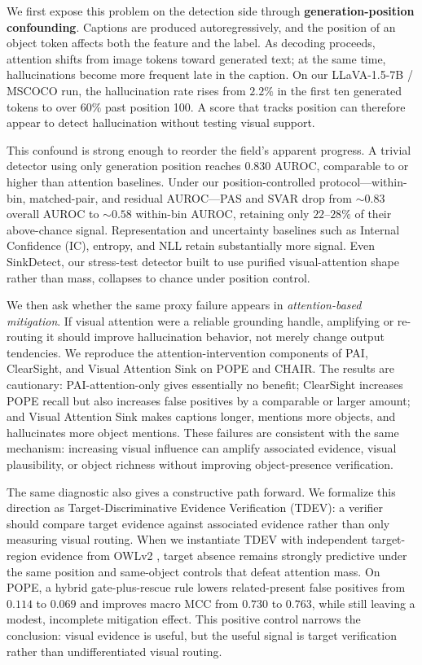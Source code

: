 We first expose this problem on the detection side through \textbf{generation-position confounding}. Captions are produced autoregressively, and the position of an object token affects both the feature and the label. As decoding proceeds, attention shifts from image tokens toward generated text; at the same time, hallucinations become more frequent late in the caption. On our LLaVA-1.5-7B / MSCOCO run, the hallucination rate rises from $2.2\%$ in the first ten generated tokens to over $60\%$ past position 100. A score that tracks position can therefore appear to detect hallucination without testing visual support.

This confound is strong enough to reorder the field's apparent progress. A trivial detector using only generation position reaches $0.830$ AUROC, comparable to or higher than attention baselines. Under our position-controlled protocol---within-bin, matched-pair, and residual AUROC---PAS and SVAR drop from $\sim$$0.83$ overall AUROC to $\sim$$0.58$ within-bin AUROC, retaining only $22$--$28\%$ of their above-chance signal. Representation and uncertainty baselines such as Internal Confidence (IC), entropy, and NLL retain substantially more signal. Even SinkDetect, our stress-test detector built to use purified visual-attention shape rather than mass, collapses to chance under position control.

We then ask whether the same proxy failure appears in \emph{attention-based mitigation}. If visual attention were a reliable grounding handle, amplifying or re-routing it should improve hallucination behavior, not merely change output tendencies. We reproduce the attention-intervention components of PAI, ClearSight, and Visual Attention Sink on POPE and CHAIR. The results are cautionary: PAI-attention-only gives essentially no benefit; ClearSight increases POPE recall but also increases false positives by a comparable or larger amount; and Visual Attention Sink makes captions longer, mentions more objects, and hallucinates more object mentions. These failures are consistent with the same mechanism: increasing visual influence can amplify associated evidence, visual plausibility, or object richness without improving object-presence verification.

The same diagnostic also gives a constructive path forward. We formalize this direction as Target-Discriminative Evidence Verification (TDEV): a verifier should compare target evidence against associated evidence rather than only measuring visual routing. When we instantiate TDEV with independent target-region evidence from OWLv2 \cite{minderer2023scaling}, target absence remains strongly predictive under the same position and same-object controls that defeat attention mass. On POPE, a hybrid gate-plus-rescue rule lowers related-present false positives from $0.114$ to $0.069$ and improves macro MCC from $0.730$ to $0.763$, while still leaving a modest, incomplete mitigation effect. This positive control narrows the conclusion: visual evidence is useful, but the useful signal is target verification rather than undifferentiated visual routing.

